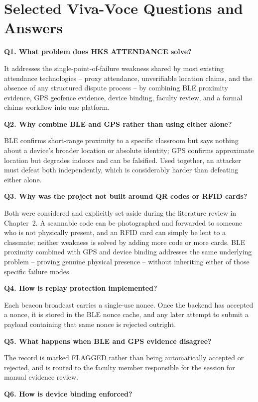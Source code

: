 \documentclass[12pt, a4paper, oneside]{report}
\begin{document}
\chapter{Selected Viva-Voce Questions and Answers}
\label{app:viva}

\noindent\textbf{Q1. What problem does HKS ATTENDANCE solve?}

It addresses the single-point-of-failure weakness shared by most existing attendance technologies -- proxy attendance, unverifiable location claims, and the absence of any structured dispute process -- by combining BLE proximity evidence, GPS geofence evidence, device binding, faculty review, and a formal claims workflow into one platform.

\noindent\textbf{Q2. Why combine BLE and GPS rather than using either alone?}

BLE confirms short-range proximity to a specific classroom but says nothing about a device's broader location or absolute identity; GPS confirms approximate location but degrades indoors and can be falsified. Used together, an attacker must defeat both independently, which is considerably harder than defeating either alone.

\noindent\textbf{Q3. Why was the project not built around QR codes or RFID cards?}

Both were considered and explicitly set aside during the literature review in Chapter~2. A scannable code can be photographed and forwarded to someone who is not physically present, and an RFID card can simply be lent to a classmate; neither weakness is solved by adding more code or more cards. BLE proximity combined with GPS and device binding addresses the same underlying problem -- proving genuine physical presence -- without inheriting either of those specific failure modes.

\noindent\textbf{Q4. How is replay protection implemented?}

Each beacon broadcast carries a single-use nonce. Once the backend has accepted a nonce, it is stored in the BLE nonce cache, and any later attempt to submit a payload containing that same nonce is rejected outright.

\noindent\textbf{Q5. What happens when BLE and GPS evidence disagree?}

The record is marked FLAGGED rather than being automatically accepted or rejected, and is routed to the faculty member responsible for the session for manual evidence review.

\noindent\textbf{Q6. How is device binding enforced?}
\end{document}
